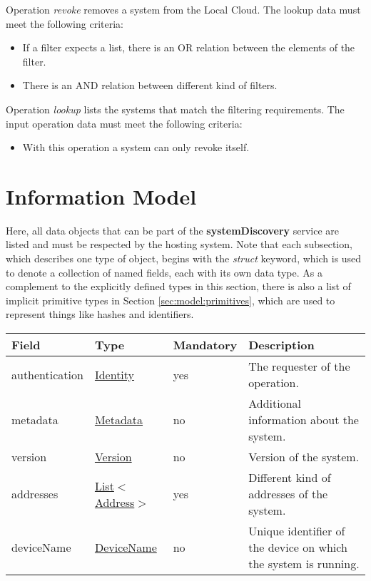 \documentclass[a4paper]{arrowhead}
\newcommand{\pref}[1]{{\textcolor{ArrowheadGrey}{\hyperref[sec:model:primitives:#1]{#1}}}}
\begin{document}

Operation \textit{revoke} removes a system from the Local Cloud. The lookup data must meet the following criteria:

\begin{itemize}
    \item If a filter expects a list, there is an OR relation between the elements of the filter.
    \item There is an AND relation between different kind of filters.
\end{itemize}


Operation \textit{lookup} lists the systems that match the filtering requirements. The input operation data must meet the following criteria:

\begin{itemize}
    \item With this operation a system can only revoke itself.
\end{itemize}

\clearpage

\section{Information Model}
\label{sec:model}

Here, all data objects that can be part of the \textbf{systemDiscovery} service are listed and must be respected by the hosting system.
Note that each subsection, which describes one type of object, begins with the \textit{struct} keyword, which is used to denote a collection of named fields, each with its own data type.
As a complement to the explicitly defined types in this section, there is also a list of implicit primitive types in Section \ref{sec:model:primitives}, which are used to represent things like hashes and identifiers.

{}
 
\begin{table}[ht!]
\begin{tabularx}{\textwidth}{| p{3cm} | p{3cm} | p{2cm} | X |} \hline
\rowcolor{gray!33} Field & Type & Mandatory & Description \\ \hline
authentication & \hyperref[sec:model:Identity]{Identity} & yes & The requester of the operation. \\ \hline
metadata &\hyperref[sec:model:Metadata]{Metadata} & no & Additional information about the system. \\ \hline
version &\pref{Version} & no & Version of the system. \\ \hline
addresses &  \pref{List}$<$\pref{Address}$>$ & yes & Different kind of addresses of the system.  \\ \hline
deviceName & \pref{DeviceName} & no & Unique identifier of the device on which the system is running. \\ \hline
\end{tabularx}
\end{table}
\end{document}
